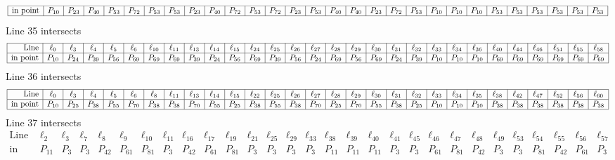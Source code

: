 \documentclass{article}
\begin{document}
{$$\begin{array}{|r*{28}{|c}|}
\hline
\mbox{in point}  & P_{10} & P_{23} & P_{40} & P_{53} & P_{72} & P_{53} & P_{53} & P_{23} & P_{40} & P_{72} & P_{53} & P_{72} & P_{23} & P_{53} & P_{40} & P_{40} & P_{23} & P_{72} & P_{53} & P_{10} & P_{10} & P_{10} & P_{53} & P_{53} & P_{53} & P_{53} & P_{53} & P_{53}\\
\hline
\end{array}
$$
Line 35 intersects 
$$
\begin{array}{|r*{28}{|c}|}
\hline
\mbox{Line}  & \ell_{0} & \ell_{3} & \ell_{4} & \ell_{5} & \ell_{6} & \ell_{10} & \ell_{11} & \ell_{13} & \ell_{14} & \ell_{15} & \ell_{24} & \ell_{25} & \ell_{26} & \ell_{27} & \ell_{28} & \ell_{29} & \ell_{30} & \ell_{31} & \ell_{32} & \ell_{33} & \ell_{34} & \ell_{36} & \ell_{40} & \ell_{44} & \ell_{46} & \ell_{51} & \ell_{55} & \ell_{58}\\
\hline
\mbox{in point}  & P_{10} & P_{24} & P_{39} & P_{56} & P_{69} & P_{69} & P_{69} & P_{39} & P_{24} & P_{56} & P_{69} & P_{39} & P_{56} & P_{24} & P_{69} & P_{56} & P_{69} & P_{24} & P_{39} & P_{10} & P_{10} & P_{10} & P_{69} & P_{69} & P_{69} & P_{69} & P_{69} & P_{69}\\
\hline
\end{array}
$$
Line 36 intersects 
$$
\begin{array}{|r*{28}{|c}|}
\hline
\mbox{Line}  & \ell_{0} & \ell_{3} & \ell_{4} & \ell_{5} & \ell_{6} & \ell_{8} & \ell_{11} & \ell_{13} & \ell_{14} & \ell_{15} & \ell_{22} & \ell_{25} & \ell_{26} & \ell_{27} & \ell_{28} & \ell_{29} & \ell_{30} & \ell_{31} & \ell_{32} & \ell_{33} & \ell_{34} & \ell_{35} & \ell_{38} & \ell_{42} & \ell_{47} & \ell_{52} & \ell_{56} & \ell_{60}\\
\hline
\mbox{in point}  & P_{10} & P_{25} & P_{38} & P_{55} & P_{70} & P_{38} & P_{38} & P_{70} & P_{55} & P_{25} & P_{38} & P_{55} & P_{38} & P_{70} & P_{25} & P_{70} & P_{55} & P_{38} & P_{25} & P_{10} & P_{10} & P_{10} & P_{38} & P_{38} & P_{38} & P_{38} & P_{38} & P_{38}\\
\hline
\end{array}
$$
Line 37 intersects 
$$
\begin{array}{|r*{28}{|c}|}
\hline
\mbox{Line}  & \ell_{2} & \ell_{3} & \ell_{7} & \ell_{8} & \ell_{9} & \ell_{10} & \ell_{11} & \ell_{16} & \ell_{17} & \ell_{19} & \ell_{21} & \ell_{25} & \ell_{29} & \ell_{33} & \ell_{38} & \ell_{39} & \ell_{40} & \ell_{41} & \ell_{45} & \ell_{46} & \ell_{47} & \ell_{48} & \ell_{49} & \ell_{53} & \ell_{54} & \ell_{55} & \ell_{56} & \ell_{57}\\
\hline
\mbox{in point}  & P_{11} & P_{3} & P_{3} & P_{42} & P_{61} & P_{81} & P_{3} & P_{42} & P_{61} & P_{81} & P_{3} & P_{3} & P_{3} & P_{3} & P_{11} & P_{11} & P_{11} & P_{3} & P_{3} & P_{61} & P_{81} & P_{42} & P_{3} & P_{3} & P_{81} & P_{42} & P_{61} & P_{3}\\

\end{array}$$}
\end{document}
